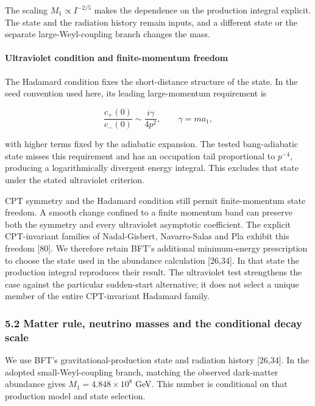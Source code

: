 \documentclass[
]{article}
\begin{document}
The scaling \(M_1\propto I^{-2/5}\) makes the dependence on the
production integral explicit. The state and the radiation history remain
inputs, and a different state or the separate large-Weyl-coupling branch
changes the mass.

\paragraph{Ultraviolet condition and finite-momentum
freedom}\label{ultraviolet-condition-and-finite-momentum-freedom}

The Hadamard condition fixes the short-distance structure of the state.
In the seed convention used here, its leading large-momentum requirement
is

\[
\frac{c_+(0)}{c_-(0)}\sim\frac{i\gamma}{4p^2},\qquad \gamma=ma_1,
\]

with higher terms fixed by the adiabatic expansion. The tested
bang-adiabatic state misses this requirement and has an occupation tail
proportional to \(p^{-4}\), producing a logarithmically divergent energy
integral. This excludes that state under the stated ultraviolet
criterion.

CPT symmetry and the Hadamard condition still permit finite-momentum
state freedom. A smooth change confined to a finite momentum band can
preserve both the symmetry and every ultraviolet asymptotic coefficient.
The explicit CPT-invariant families of Nadal-Gisbert, Navarro-Salas and
Pla exhibit this freedom {[}80{]}. We therefore retain BFT's additional
minimum-energy prescription to choose the state used in the abundance
calculation {[}26,34{]}. In that state the production integral
reproduces their result. The ultraviolet test strengthens the case
against the particular sudden-start alternative; it does not select a
unique member of the entire CPT-invariant Hadamard family.

\subsubsection{5.2 Matter rule, neutrino masses and the conditional
decay
scale}\label{matter-rule-neutrino-masses-and-the-conditional-decay-scale}

We use BFT's gravitational-production state and radiation history
{[}26,34{]}. In the adopted small-Weyl-coupling branch, matching the
observed dark-matter abundance gives \(M_1=4.848\times10^8\) GeV. This
number is conditional on that production model and state selection.
\end{document}
